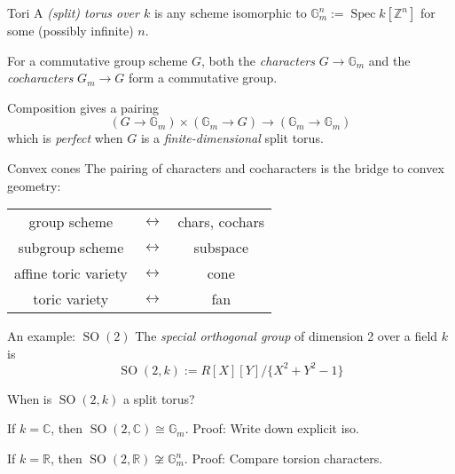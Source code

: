 \documentclass[10pt, handout]{beamer}
\DeclareMathOperator{\Spec}{Spec}
\DeclareMathOperator{\SO}{SO}
\providecommand{\C}{{\mathbb C}}
\providecommand{\G}{{\mathbb G}}
\providecommand{\R}{{\mathbb R}}
\providecommand{\Z}{{\mathbb Z}}
\begin{document}
\begin{frame}{Tori}
    A \emph{(split) torus over $k$} is any scheme isomorphic to $\G_m^n := \Spec k[\Z^n]$ for some (possibly infinite) $n$.

    For a commutative group scheme $G$, both the \emph{characters} $G \to \G_m$ and the \emph{cocharacters} $G_m \to G$ form a commutative group.

    \pause

    Composition gives a pairing
    \[
        (G \to \G_m) \times (\G_m \to G) \to (\G_m \to \G_m)
    \]
    which is \emph{perfect} when $G$ is a \emph{finite-dimensional} split torus.
\end{frame}


\begin{frame}{Convex cones}
    The pairing of characters and cocharacters is the bridge to convex geometry:
    \begin{table}[]
        \begin{tabular}{ccc}
            group scheme          & $\leftrightarrow$ & chars, cochars \\
            subgroup scheme       & $\leftrightarrow$ & subspace       \\
            affine toric variety  & $\leftrightarrow$ & cone           \\
            toric variety         & $\leftrightarrow$ & fan            \\
        \end{tabular}
    \end{table}
\end{frame}


\begin{frame}{An example: \texorpdfstring{$\SO(2)$}{SO(2)}}
    The \emph{special orthogonal group} of dimension 2 over a field $k$ is
    \[
        \SO(2, k) := R[X][Y] / \{X ^ 2 + Y ^ 2 - 1\}
    \]

    \pause

    When is $\SO(2, k)$ a split torus?

    If $k = \C$, then $\SO(2, \C) \cong \G_m$. Proof: Write down explicit iso.

    If $k = \R$, then $\SO(2, \R) \not\cong \G_m^n$. Proof: Compare torsion characters.
\end{frame}
\end{document}
